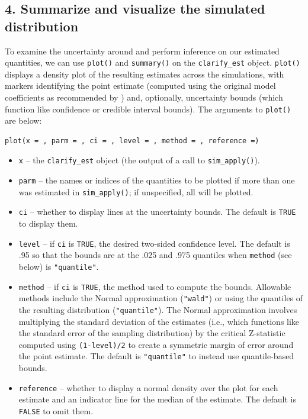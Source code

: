 \subsection{4. Summarize and visualize the simulated distribution}\label{summarize-and-visualize-the-simulated-distribution}
To examine the uncertainty around and perform inference on our estimated quantities, we can use \texttt{plot()} and \texttt{summary()} on the \texttt{clarify\_est} object.
\texttt{plot()} displays a density plot of the resulting estimates across the simulations, with markers identifying the point estimate (computed using the original model coefficients as recommended by \citet{raineyCarefulConsiderationCLARIFY2023}) and, optionally, uncertainty bounds (which function like confidence or credible interval bounds). The arguments to \texttt{plot()} are below:
\begin{verbatim}
plot(x = , parm = , ci = , level = , method = , reference =)
\end{verbatim}
\begin{itemize}
\tightlist
\item
  \texttt{x} -- the \texttt{clarify\_est} object (the output of a call to \texttt{sim\_apply()}).
\item
  \texttt{parm} -- the names or indices of the quantities to be plotted if more than one was estimated in \texttt{sim\_apply()}; if unspecified, all will be plotted.
\item
  \texttt{ci} -- whether to display lines at the uncertainty bounds. The default is \texttt{TRUE} to display them.
\item
  \texttt{level} -- if \texttt{ci} is \texttt{TRUE}, the desired two-sided confidence level. The default is .95 so that the bounds are at the .025 and .975 quantiles when \texttt{method} (see below) is \texttt{"quantile"}.
\item
  \texttt{method} -- if \texttt{ci} is \texttt{TRUE}, the method used to compute the bounds. Allowable methods include the Normal approximation (\texttt{"wald"}) or using the quantiles of the resulting distribution (\texttt{"quantile"}). The Normal approximation involves multiplying the standard deviation of the estimates (i.e., which functions like the standard error of the sampling distribution) by the critical Z-statistic computed using \texttt{(1-level)/2} to create a symmetric margin of error around the point estimate. The default is \texttt{"quantile"} to instead use quantile-based bounds.
\item
  \texttt{reference} -- whether to display a normal density over the plot for each estimate and an indicator line for the median of the estimate. The default is \texttt{FALSE} to omit them.
\end{itemize}
